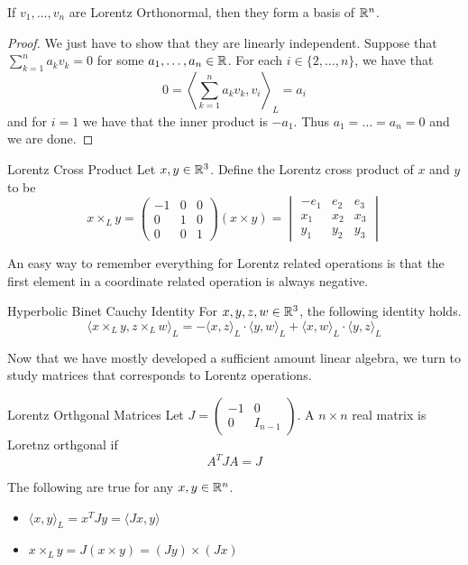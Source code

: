 \documentclass[a4paper]{article}
\begin{document}
\begin{lmm}{}{} If $v_1,\dots,v_n$ are Lorentz Orthonormal, then they form a basis of $\mathbb{R}^n$. \tcbline
\begin{proof}
We just have to show that they are linearly independent. Suppose that $\sum_{k=1}^na_kv_k=0$ for some $a_1,\dots,a_n\in\mathbb{R}$. For each $i\in\{2,\dots,n\}$, we have that $$0=\left\langle\sum_{k=1}^na_kv_k,v_i\right\rangle_L=a_i$$ and for $i=1$ we have that the inner product is $-a_1$. Thus $a_1=\dots=a_n=0$ and we are done. 
\end{proof}
\end{lmm}

\begin{defn}{Lorentz Cross Product}{} Let $x,y\in\mathbb{R}^3$. Define the Lorentz cross product of $x$ and $y$ to be $$x\times_L y=\begin{pmatrix}
-1 & 0 & 0\\
0 & 1 & 0\\
0 & 0 & 1
\end{pmatrix}(x\times y)=\begin{vmatrix}
-e_1 & e_2 & e_3\\
x_1 & x_2 & x_3\\
y_1 & y_2 & y_3
\end{vmatrix}$$
\end{defn}

An easy way to remember everything for Lorentz related operations is that the first element in a coordinate related operation is always negative. 

\begin{lmm}{Hyperbolic Binet Cauchy Identity}{} For $x,y,z,w\in\mathbb{R}^3$, the following identity holds. $$\langle x\times_Ly,z\times_L w\rangle_L=-\langle x,z\rangle_L\cdot\langle y,w\rangle_L+\langle x,w\rangle_L\cdot\langle y,z\rangle_L$$
\end{lmm}

Now that we have mostly developed a sufficient amount linear algebra, we turn to study matrices that corresponds to Lorentz operations. 

\begin{defn}{Lorentz Orthgonal Matrices}{} Let $J=\begin{pmatrix}-1&0\\0&I_{n-1}\end{pmatrix}$. A $n\times n$ real matrix is Loretnz orthgonal if $$A^TJA=J$$
\end{defn}

\begin{prp}{}{} The following are true for any $x,y\in\mathbb{R}^n$. 
\begin{itemize}
\item $\langle x,y\rangle_L=x^TJy=\langle Jx,y\rangle$
\item $x\times_Ly=J(x\times y)=(Jy)\times(Jx)$
\end{itemize}
\end{prp}
\end{document}
